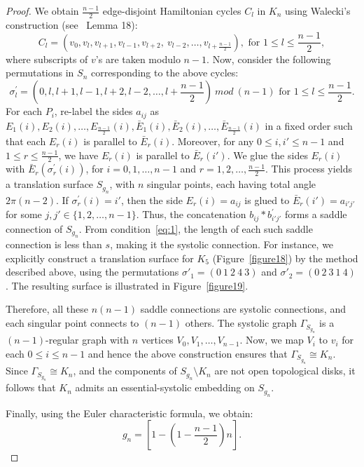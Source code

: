 \documentclass[11pt]{amsart}
\theoremstyle{plain}
\theoremstyle{definition}
\theoremstyle{remark}
\numberwithin{equation}{section}
\numberwithin{figure}{section}
\begin{document}
\begin{proof}
We obtain ${\frac{n-1}{2}}$ edge-disjoint Hamiltonian cycles $C_l$ in $K_n$ using Walecki's construction (see~\cite{MR4089838} Lemma 18):
$$C_l= \left(v_0, v_l, v_{l+1}, v_{l-1}, v_{l+2},\ v_{l-2},\dots,  v_{l+\frac{n-1}{2}}\right), \text{ for }1 \leq l \leq \frac{n-1}{2},$$ where subscripts of $v$'s are taken modulo $n-1$. Now, consider the following permutations in $S_n$ corresponding to the above cycles: $$\sigma_l^\prime = \left(0,l, l+1, l-1, l+2, l-2, \dots, l+\frac{n-1}{2} \right) ~mod~(n-1) \text{ for }1 \leq l \leq \frac{n-1}{2}.$$
 For each  $P_i$, re-label the sides $a_{ij}$ as $E_1(i), E_2(i), \dots, E_{\frac{n-1}{2}}(i),\bar{E}_1(i), \bar{E}_2(i), \dots, \bar{E}_{\frac{n-1}{2}}(i)$ in a fixed order such that each \( E_r(i) \) is parallel to \( \bar{E}_r(i) \). Moreover, for any \( 0 \leq i, i' \leq n-1 \) and \( 1 \leq r \leq \frac{n-1}{2} \), we have $E_r(i)$ is parallel to $\bar{E}_r(i')$. We glue the sides $E_r(i)$ with $\bar{E}_r(\sigma_r^\prime(i))$, for $i = 0, 1, \dots, n-1$ and $r = 1, 2, \dots, \frac{n-1}{2}$. This process yields a translation surface $S_{g_n}$, with $n$ singular points, each having total angle $2\pi(n - 2)$. If $\sigma_r^\prime(i) = i'$, then the side $E_r(i) = a_{ij}$ is glued to $\bar{E}_r(i') = a_{i'j'}$ for some $j, j' \in \{1, 2, \dots, n-1\}$. Thus, the concatenation $b_{ij} * b_{i'j'}^\prime$ forms a saddle connection of $S_{g_n}$. From condition~\eqref{eq:1}, the length of each such saddle connection is less than $s$, making it the systolic connection. For instance, we explicitly construct a translation surface for \( K_5 \) (Figure~\ref{figure18}) by the method described above, using the permutations \( \sigma'_1 = (0\ 1\ 2\ 4\ 3) \) and \( \sigma'_2 = (0\ 2\ 3\ 1\ 4) \). The resulting surface is illustrated in Figure~\ref{figure19}.

Therefore, all these $n(n-1)$ saddle connections are systolic connections, and each singular point connects to $(n-1)$ others. The systolic graph $\Gamma_{S_{g_n}}$ is a $(n-1)$-regular graph with $n$ vertices $V_0, V_1,\dots, V_{n-1}$. Now, we map $V_i$ to $v_i$ for each $0\le i\le n-1$ and hence the above construction ensures that $\Gamma_{S_{g_n}}\cong K_n$. Since $\Gamma_{S_{g_n}} \cong K_n$, and the components of $S_{g_n} \setminus K_n$ are not open topological disks, it follows that $K_n$ admits an essential-systolic embedding on $S_{g_n}$.

Finally, using the Euler characteristic formula, we obtain: $$g_n = \left[1 - \left(1 - \frac{n-1}{2} \right)n\right].$$


\end{proof}
\end{document}
